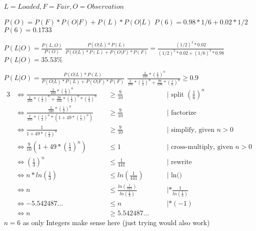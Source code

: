 $L = Loaded, F = Fair, O = Observation$

$P(O) = P(F)* P(O|F)+ P(L) * P(O|L)$
$P(6) = 0.98*1/6 + 0.02*1/2$
$P(6) = 0.1733$


$P(L|O) = \frac{P(L,O)}{P(O)}$
$\frac{P(O|L)*P(L)}{P(O|L)*P(L) + P(O|F)*P(F)} = \frac{(1/2)^3*0.02}{(1/2)^3*0.02 + (1/6)^3*0.98}$
$P(L|O) = 35.53\%$


$P(L|O) = \frac{P(O|L)*P(L)}{P(O|L)*P(L) + P(O|F)*P(F)}$
$\frac{\frac{2}{100}*(\frac{1}{2})^n}{\frac{2}{100}*(\frac{1}{2})^n + \frac{98}{100}*(\frac{1}{6})^n} \geq 0.9$
\begin{alignat}{3}
&\iff \frac{\frac{2}{100}*(\frac{1}{2})^n}{\frac{2}{100}*(\frac{1}{2})^n + \frac{98}{100}*(\frac{1}{2})^n * (\frac{1}{3})^n} &&\geq \frac{9}{10}  &&\quad| \text{ split } (\frac{1}{6})^n\\
&\iff \frac{\frac{2}{100}*(\frac{1}{2})^n}{\frac{2}{100}*(\frac{1}{2})^n * (1 + 49 * (\frac{1}{3})^n)} &&\geq \frac{9}{10}  &&\quad| \text{ factorize}\\
&\iff \frac{1}{1 + 49 * (\frac{1}{3})^n} &&\geq \frac{9}{10} &&\quad| \text{ simplify, given } n > 0\\
&\iff \frac{9}{10} (1 + 49 * (\frac{1}{3})^n) &&\leq 1  &&\quad| \text{ cross-multiply, given } n > 0\\
&\iff (\frac{1}{3})^n &&\leq \frac{1}{441} &&\quad| \text{ rewrite }\\
&\iff n * ln(\frac{1}{3}) &&\leq ln(\frac{1}{441}) &&\quad| \text{ ln() }\\
&\iff n &&\leq \frac{ln(\frac{1}{441})}{ln(\frac{1}{3})} &&\quad| *\frac{1}{ln(\frac{1}{3})} \\
&\iff -5.542487... &&\leq n &&\quad| * (-1)\\
&\iff n &&\geq 5.542487...
\end{alignat}
$n = 6$ as only Integers make sense here (just trying would also work)
